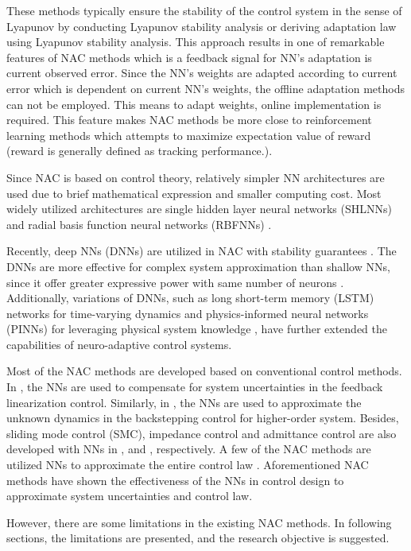 These methods typically ensure the stability of the control system in the sense of Lyapunov by conducting Lyapunov stability analysis or deriving adaptation law using Lyapunov stability analysis.
This approach results in one of remarkable features of NAC methods which is a feedback signal for NN's adaptation is current observed error.
Since the NN's weights are adapted according to current error which is dependent on current NN's weights, the offline adaptation methods can not be employed.
This means to adapt weights, online implementation is required.
This feature makes NAC methods be more close to reinforcement learning methods which attempts to maximize expectation value of reward (\ie reward is generally defined as tracking performance.).

Since NAC is based on control theory, relatively simpler NN architectures are used due to brief mathematical expression and smaller computing cost.
Most widely utilized architectures are single hidden layer neural networks (SHLNNs) \cite{RN69, RN18, RN85, RN46, RN95, RN108} and radial basis function neural networks (RBFNNs) \cite{RN89, RN82, RN64, RN71, RN19, RN21}.

Recently, deep NNs (DNNs) are utilized in NAC with stability guarantees \cite{RN13}.
The DNNs are more effective for complex system approximation than shallow NNs, since it offer greater expressive power with same number of neurons \cite{RN65}.
Additionally, variations of DNNs, such as long short-term memory (LSTM) networks for time-varying dynamics \cite{RN11} and physics-informed neural networks (PINNs) for leveraging physical system knowledge \cite{RN12}, have further extended the capabilities of neuro-adaptive control systems.

Most of the NAC methods are developed based on conventional control methods.
In \cite{RN69, RN95}, the NNs are used to compensate for system uncertainties in the feedback linearization control.
Similarly, in \cite{RN85, RN19, RN71, RN80}, the NNs are used to approximate the unknown dynamics in the backstepping control for higher-order system.
Besides, sliding mode control (SMC), impedance control and admittance control are also developed with NNs in \cite{RN64}, \cite{RN89} and \cite{RN82}, respectively.
A few of the NAC methods are utilized NNs to approximate the entire control law \cite{RN46}.
Aforementioned NAC methods have shown the effectiveness of the NNs in control design to approximate system uncertainties and control law.

However, there are some limitations in the existing NAC methods.
In following sections, the limitations are presented, and the research objective is suggested.

